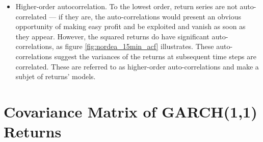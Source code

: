 \documentclass{report}
\begin{document}
\begin{itemize}
\item Higher-order autocorrelation. To the lowest order, return series
  are not auto-correlated --- if they are, the auto-correlations would
  present an obvious opportunity of making easy profit and be
  exploited and vanish as soon as they appear. However, the squared
  returns do have significant auto-correlations, as figure
  \ref{fig:nordea_15min_acf} illustrates. These auto-correlations
  suggest the variances of the returns at subsequent time steps are
  correlated. These are referred to as higher-order auto-correlations
  and make a subjet of returns' models.
  
\end{itemize}




\chapter{Covariance Matrix of GARCH(1,1) Returns}
\label{chp:CrossCorrelationFat}

\end{document}
